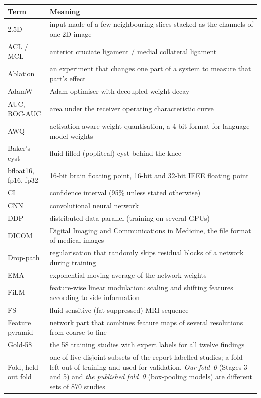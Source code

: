 {\singlespacing\footnotesize
\begin{longtable}{@{}L{3.0cm}L{12.0cm}@{}}
\toprule
\textbf{Term} & \textbf{Meaning} \\
\midrule
\endhead
2.5D & input made of a few neighbouring slices stacked as the channels of one 2D image \\
ACL / MCL & anterior cruciate ligament / medial collateral ligament \\
Ablation & an experiment that changes one part of a system to measure that part's effect \\
AdamW & Adam optimiser with decoupled weight decay \\
AUC, ROC-AUC & area under the receiver operating characteristic curve \\
AWQ & activation-aware weight quantisation, a 4-bit format for language-model weights \\
Baker's cyst & fluid-filled (popliteal) cyst behind the knee \\
bfloat16, fp16, fp32 & 16-bit brain floating point, 16-bit and 32-bit IEEE floating point \\
CI & confidence interval (95\% unless stated otherwise) \\
CNN & convolutional neural network \\
DDP & distributed data parallel (training on several GPUs) \\
DICOM & Digital Imaging and Communications in Medicine, the file format of medical images \\
Drop-path & regularisation that randomly skips residual blocks of a network during training \\
EMA & exponential moving average of the network weights \\
FiLM & feature-wise linear modulation: scaling and shifting features according to side information \\
FS & fluid-sensitive (fat-suppressed) MRI sequence \\
Feature pyramid & network part that combines feature maps of several resolutions from coarse to fine \\
Gold-58 & the 58 training studies with expert labels for all twelve findings \\
Fold, held-out fold & one of five disjoint subsets of the report-labelled studies; a fold left out of training and used for validation. \emph{Our fold~0} (Stages 3 and 5) and \emph{the published fold~0} (box-pooling models) are different sets of 870 studies \\

\end{longtable}}
